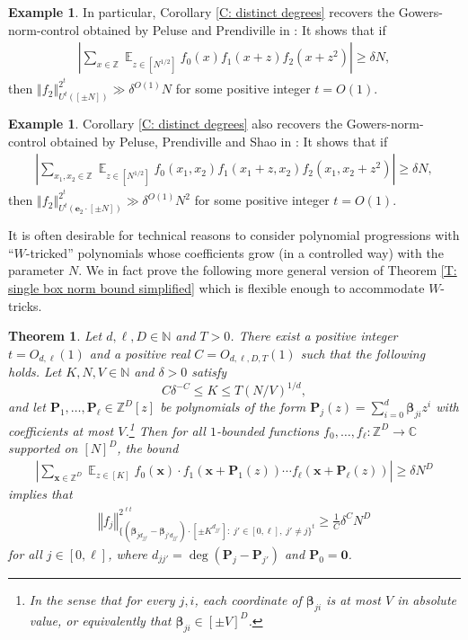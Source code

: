 \documentclass[11pt]{amsart}
\newtheorem{theorem}[lemma]{Theorem}
\theoremstyle{definition}
\newtheorem{example}[lemma]{Example} %
\DeclareMathOperator*{\E}{\mathbb{E}}
\newcommand{\C}{{\mathbb C}}
\newcommand{\N}{{\mathbb N}}
\newcommand{\Z}{{\mathbb Z}}
\newcommand{\be}{{\mathbf{e}}}
\newcommand{\bp}{{\mathbf{P}}}
\newcommand{\p}{{\mathbf{P}}}
\newcommand{\bx}{{\mathbf{x}}}
\newcommand{\bbeta}{{\boldsymbol{\beta}}}
\newcommand{\norm}[1]{\left\Vert #1\right\Vert}
\newcommand{\abs}[1]{\mathopen{}\left| #1\mathclose{}\right|}
\begin{document}
\begin{example}
    In particular, Corollary \ref{C: distinct degrees} recovers the Gowers-norm-control obtained by Peluse and Prendiville in \cite{PP19}: It shows that if
    \begin{align*}
        \abs{\sum_{x\in\Z}\E_{z\in[N^{1/2}]}f_0(x)f_1(x+z)f_2(x+z^2)} \geq \delta N,
    \end{align*}
    then $\norm{f_2}_{U^t([\pm N])}^{2^t}\gg \delta^{O(1)}N$ for some positive integer $t=O(1)$.
\end{example}
\begin{example}
    Corollary \ref{C: distinct degrees} also recovers the Gowers-norm-control obtained by Peluse, Prendiville and Shao in \cite{PPS24}: It shows that if
    \begin{align*}
        \abs{\sum_{x_1,x_2\in\Z}\E_{z\in[N^{1/2}]}f_0(x_1,x_2)f_1(x_1+z,x_2)f_2(x_1, x_2+z^2)} \geq \delta N,
    \end{align*}
    then $\norm{f_2}_{U^t(\be_2 \cdot [\pm N])}^{2^t}\gg \delta^{O(1)}N^2$ for some positive integer $t=O(1)$.
\end{example}

It is often desirable for technical reasons to consider polynomial progressions with ``$W$-tricked'' polynomials whose coefficients grow (in a controlled way) with the parameter $N$.  We in fact prove the following more general version of Theorem \ref{T: single box norm bound simplified} which is flexible enough to accommodate $W$-tricks.

\begin{theorem}\label{T: single box norm bound}
Let $d, \ell,D \in \N$ and $T>0$. There exist a positive integer $t=O_{d, \ell}(1)$ and a positive real $C=O_{d,\ell,D,T}(1)$ such that the following holds.  Let $K, N, V\in\N$ and $\delta>0$ satisfy $$C\delta^{-C}\leq  K\leq T (N/V)^{1/d},$$  and let $\bp_1, \ldots, \bp_\ell\in\Z^D[z]$ be polynomials of the form $\bp_j(z) = \sum_{i=0}^d \bbeta_{ji}z^i$ with coefficients  at most $V$.\footnote{In the sense that for every $j,i$, each coordinate of $\bbeta_{ji}$ is at most $V$ in absolute value, or equivalently that $\bbeta_{ji}\in[\pm V]^D$.}
     Then for all $1$-bounded functions $f_0, \ldots, f_\ell:\Z^D\to\C$ supported on $[N]^D$, the bound
    \begin{align*}
            \abs{\sum_{\bx\in\Z^D}\E_{z\in[K]}
            f_0(\bx)\cdot f_1(\bx+\p_1(z))\cdots f_\ell(\bx+\p_\ell(z))} \geq \delta N^D
    \end{align*}
    implies that
    \begin{align}\label{E: the box norm 0}
        \norm{f_j}_{\{(\bbeta_{jd_{jj'}}-\bbeta_{j'd_{jj'}})\cdot[\pm K^{d_{jj'}}]:\; j'\in[0,\ell],\; j'\neq j\}^{ t}}^{2^{\ell t}} \geq \frac{1}{C}\delta^{C}N^{D}
    \end{align}
    for all $j\in[0,\ell]$, where $d_{jj'} = \deg (\bp_j - \bp_{j'})$ and $\bp_0 = \mathbf{0}$.
\end{theorem}
 
\end{document}
